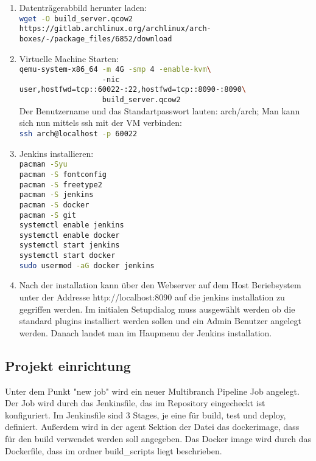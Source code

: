 \begin{enumerate}
    \item Datenträgerabbild herunter laden:\\
        \lstinline[language=sh]!wget -O build_server.qcow2 https://gitlab.archlinux.org/archlinux/arch-boxes/-/package_files/6852/download!
    \item Virtuelle Machine Starten:\\
    \lstinline[language=sh]!qemu-system-x86_64 -m 4G -smp 4 -enable-kvm\! \\
    \lstinline[language=sh]!                   -nic user,hostfwd=tcp::60022-:22,hostfwd=tcp::8090-:8090\ !\\
    \lstinline[language=sh]!                   build_server.qcow2!\\
    Der Benutzername und das Standartpasswort lauten: arch/arch; Man kann sich nun mittels ssh mit der \ac{VM} verbinden:\\
    \lstinline[language=sh]!ssh arch@localhost -p 60022!\\
    \item Jenkins installieren:\\
    \lstinline[language=sh]!pacman -Syu !\\
    \lstinline[language=sh]!pacman -S fontconfig!\\
    \lstinline[language=sh]!pacman -S freetype2!\\
    \lstinline[language=sh]!pacman -S jenkins!\\
    \lstinline[language=sh]!pacman -S docker!\\
    \lstinline[language=sh]!pacman -S git!\\
    \lstinline[language=sh]!systemctl enable jenkins!\\
    \lstinline[language=sh]!systemctl enable docker!\\
    \lstinline[language=sh]!systemctl start jenkins!\\
    \lstinline[language=sh]!systemctl start docker!\\
    \lstinline[language=sh]!sudo usermod -aG docker jenkins!\\
    \item Nach der installation kann über den Webserver auf dem Host Beriebsystem unter der Addresse http://localhost:8090 auf die jenkins installation zu gegriffen werden. Im initialen Setupdialog muss ausgewählt werden ob die standard plugins installiert werden sollen und ein Admin Benutzer angelegt werden. Danach landet man im Haupmenu der Jenkins installation.
\end{enumerate}

\subsection{Projekt einrichtung}

Unter dem Punkt "new job" wird ein neuer Multibranch Pipeline Job angelegt. Der Job wird durch das Jenkinsfile, das im Repository eingecheckt ist konfiguriert.
Im Jenkinsfile sind 3 Stages, je eine für build, test und deploy, definiert. Außerdem wird in der agent Sektion der Datei das dockerimage, dass für den build verwendet werden soll angegeben. Das Docker image wird durch das Dockerfile, dass im ordner build\_scripts liegt beschrieben.
